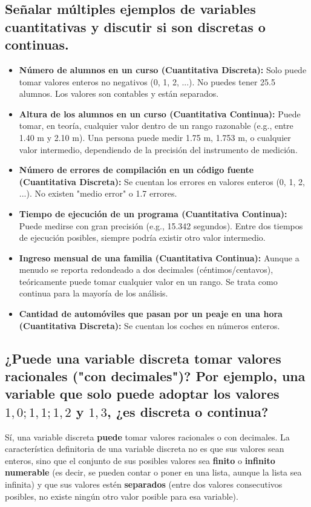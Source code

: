 \documentclass[12pt, letterpaper]{article}
\begin{document}
\subsection{Señalar múltiples ejemplos de variables cuantitativas y discutir si son discretas o continuas.}
\begin{itemize}
    \item \textbf{Número de alumnos en un curso (Cuantitativa Discreta):} Solo puede tomar valores enteros no negativos (0, 1, 2, ...). No puedes tener 25.5 alumnos. Los valores son contables y están separados.
    \item \textbf{Altura de los alumnos en un curso (Cuantitativa Continua):} Puede tomar, en teoría, cualquier valor dentro de un rango razonable (e.g., entre 1.40 m y 2.10 m). Una persona puede medir 1.75 m, 1.753 m, o cualquier valor intermedio, dependiendo de la precisión del instrumento de medición.
    \item \textbf{Número de errores de compilación en un código fuente (Cuantitativa Discreta):} Se cuentan los errores en valores enteros (0, 1, 2, ...). No existen "medio error" o 1.7 errores.
    \item \textbf{Tiempo de ejecución de un programa (Cuantitativa Continua):} Puede medirse con gran precisión (e.g., 15.342 segundos). Entre dos tiempos de ejecución posibles, siempre podría existir otro valor intermedio.
    \item \textbf{Ingreso mensual de una familia (Cuantitativa Continua):} Aunque a menudo se reporta redondeado a dos decimales (céntimos/centavos), teóricamente puede tomar cualquier valor en un rango. Se trata como continua para la mayoría de los análisis.
    \item \textbf{Cantidad de automóviles que pasan por un peaje en una hora (Cuantitativa Discreta):} Se cuentan los coches en números enteros.
\end{itemize}


\subsection{¿Puede una variable discreta tomar valores racionales ("con decimales")? Por ejemplo, una variable que solo puede adoptar los valores $1,0; 1,1; 1,2$ y $1,3$, ¿es discreta o continua?}
Sí, una variable discreta \textbf{puede} tomar valores racionales o con decimales. La característica definitoria de una variable discreta no es que sus valores sean enteros, sino que el conjunto de sus posibles valores sea \textbf{finito} o \textbf{infinito numerable} (es decir, se pueden contar o poner en una lista, aunque la lista sea infinita) y que sus valores estén \textbf{separados} (entre dos valores consecutivos posibles, no existe ningún otro valor posible para esa variable).
\end{document}
